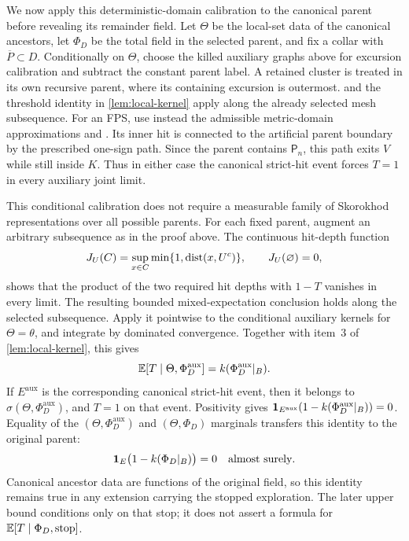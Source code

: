 We now apply this deterministic-domain calibration to the canonical
parent before revealing its remainder field.  Let \(\Theta\) be the
local-set data of the canonical ancestors, let \(\Phi_D\) be the
total field in the selected parent, and fix a collar with
\(\overline P\subset D\).  Conditionally on \(\Theta\), choose the
killed auxiliary graphs above for excursion calibration and subtract
the constant parent label.  A retained cluster is treated in its own
recursive parent, where its containing excursion is outermost.
 and the threshold
identity in \cref{lem:local-kernel} apply along the already selected
mesh subsequence.  For an FPS, use instead the admissible metric-domain
approximations and \cite[Proposition~4.7]{ALS2018}.  Its inner hit is
connected to the artificial parent boundary by the prescribed one-sign
path.  Since the parent contains \(\mathsf P_n\), this path exits
\(V\) while still inside \(K\).  Thus in either case the canonical
strict-hit event forces \(T=1\) in every auxiliary joint limit.

This conditional calibration does not require a measurable family of
Skorokhod representations over all possible parents.  For each fixed
parent, augment an arbitrary subsequence as in the proof above.
The continuous hit-depth function
\[
 J_U(C)=\sup_{x\in C}\min\{1,\operatorname{dist}(x,U^c)\},
 \qquad J_U(\varnothing)=0,
\]
shows that the product of the two required hit depths with \(1-T\)
vanishes in every limit.  The resulting bounded mixed-expectation
conclusion holds along the selected subsequence.  Apply it pointwise
to the conditional auxiliary kernels for \(\Theta=\theta\), and
integrate by dominated convergence.  Together with item~3 of
\cref{lem:local-kernel}, this gives
\[
       \mathbb E[T\mid\Theta,\Phi_D^{\mathrm{aux}}]
                    =k(\Phi_D^{\mathrm{aux}}|_B).
\]
If \(E^{\mathrm{aux}}\) is the corresponding canonical strict-hit
event, then it belongs to
\(\sigma(\Theta,\Phi_D^{\mathrm{aux}})\), and \(T=1\) on that event.
Positivity gives
\(\mathbf 1_{E^{\mathrm{aux}}}(1-k(\Phi_D^{\mathrm{aux}}|_B))=0\).
Equality of the \((\Theta,\Phi_D^{\mathrm{aux}})\) and
\((\Theta,\Phi_D)\) marginals transfers this identity to the original
parent:
\begin{equation}
             \mathbf 1_E\bigl(1-k(\Phi_D|_B)\bigr)=0
             \quad\hbox{almost surely}.
 \label{eq:kernel-forcing}
\end{equation}
Canonical ancestor data are functions of the original field, so this
identity remains true in any extension carrying the stopped exploration.
The later upper bound conditions only on that stop; it does not assert
a formula for \(\mathbb E[T\mid\Phi_D,\mathrm{stop}]\).

